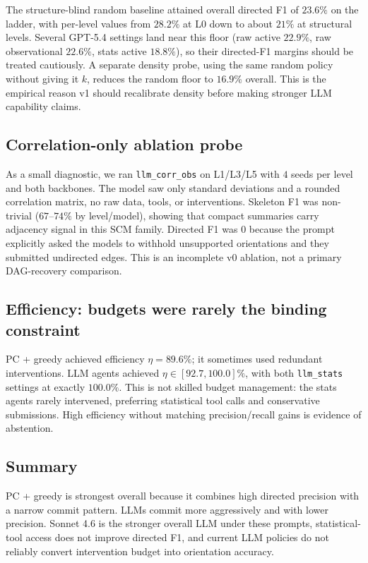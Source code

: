 The structure-blind random baseline attained overall directed F1 of $23.6\%$ on the ladder, with per-level values from $28.2\%$ at L0 down to about $21\%$ at structural levels. Several GPT-5.4 settings land near this floor (raw active $22.9\%$, raw observational $22.6\%$, stats active $18.8\%$), so their directed-F1 margins should be treated cautiously. A separate density probe, using the same random policy without giving it $k$, reduces the random floor to $16.9\%$ overall. This is the empirical reason v1 should recalibrate density before making stronger LLM capability claims.

\subsection{Correlation-only ablation probe}
\label{sec:corr-probe}

As a small diagnostic, we ran \texttt{llm\_corr\_obs} on L1/L3/L5 with $4$ seeds per level and both backbones. The model saw only standard deviations and a rounded correlation matrix, no raw data, tools, or interventions. Skeleton F1 was non-trivial ($67$--$74\%$ by level/model), showing that compact summaries carry adjacency signal in this SCM family. Directed F1 was $0$ because the prompt explicitly asked the models to withhold unsupported orientations and they submitted undirected edges. This is an incomplete v0 ablation, not a primary DAG-recovery comparison.

\subsection{Efficiency: budgets were rarely the binding constraint}

PC + greedy achieved efficiency $\eta=89.6\%$; it sometimes used redundant interventions. LLM agents achieved $\eta\in[92.7,100.0]\%$, with both \texttt{llm\_stats} settings at exactly $100.0\%$. This is not skilled budget management: the stats agents rarely intervened, preferring statistical tool calls and conservative submissions. High efficiency without matching precision/recall gains is evidence of abstention.

\subsection{Summary}

PC + greedy is strongest overall because it combines high directed precision with a narrow commit pattern. LLMs commit more aggressively and with lower precision. Sonnet 4.6 is the stronger overall LLM under these prompts, statistical-tool access does not improve directed F1, and current LLM policies do not reliably convert intervention budget into orientation accuracy.

